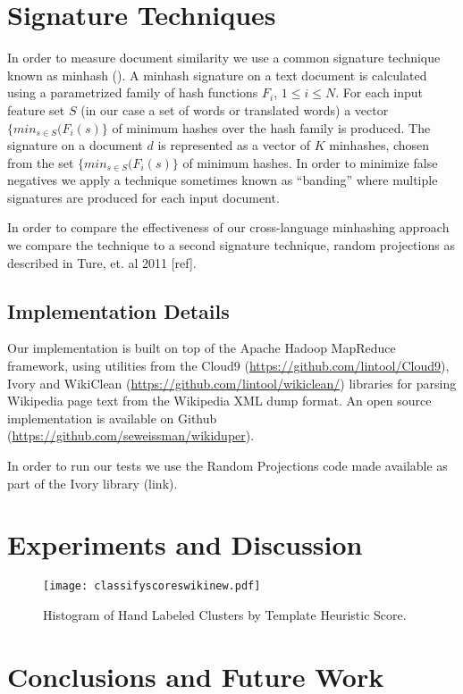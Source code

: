 \documentclass{acm_proc_article-sp}
\begin{document}
\section{Signature Techniques}

In order to measure document similarity we use a common signature technique known as minhash (\cite{broder:resemblance}). A minhash signature on a text document is calculated using a parametrized family of hash functions $F_i$, $1 \le i \le N$. For each input feature set $S$ (in our case a set of words or translated words) a vector $\{min_{s \in S}(F_i(s)\}$ of minimum hashes over the hash family is produced. The signature on a document $d$ is represented as a vector of $K$ minhashes, chosen from the set $\{min_{s \in S}(F_i(s)\}$ of minimum hashes. In order to minimize false negatives we apply a technique sometimes known as ``banding'' \cite{ullman:massive} where multiple signatures are produced for each input document.

In order to compare the effectiveness of our cross-language minhashing approach we compare the technique to a second signature technique, random projections as described in Ture, et. al 2011 [ref].  

\subsection{Implementation Details}

Our implementation is built on top of the Apache Hadoop MapReduce framework, using utilities from the Cloud9 (\url{https://github.com/lintool/Cloud9}), Ivory and WikiClean (\url{https://github.com/lintool/wikiclean/}) libraries for parsing Wikipedia page text from the Wikipedia XML dump format. An open source implementation is available on Github (\url{https://github.com/seweissman/wikiduper}).

In order to run our tests we use the Random Projections code made available as part of the Ivory library (link).

\section{Experiments and Discussion}



\begin{figure}
\centering
\texttt{[image: classifyscoreswikinew.pdf]}
\caption{Histogram of Hand Labeled Clusters by Template Heuristic Score.}
\label{heuristic}
\end{figure}


\section{Conclusions and Future Work}



\balancecolumns
\end{document}

